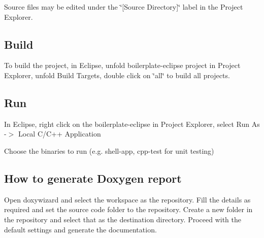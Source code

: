 Source files may be edited under the \char`\"{}\mbox{[}\+Source Directory\mbox{]}\char`\"{} label in the Project Explorer.

\subsection*{Build}

To build the project, in Eclipse, unfold boilerplate-\/eclipse project in Project Explorer, unfold Build Targets, double click on \char`\"{}all\char`\"{} to build all projects.

\subsection*{Run}


\begin{DoxyEnumerate}
\item In Eclipse, right click on the boilerplate-\/eclipse in Project Explorer, select Run As -\/$>$ Local C/\+C++ Application
\item Choose the binaries to run (e.\+g. shell-\/app, cpp-\/test for unit testing)
\end{DoxyEnumerate}

\subsection*{How to generate Doxygen report}


\begin{DoxyCode}{0}
\end{DoxyCode}
 Open doxywizard and select the workspace as the repository. Fill the details as required and set the source code folder to the repository. Create a new folder in the repository and select that as the destination directory. Proceed with the default settings and generate the documentation. 